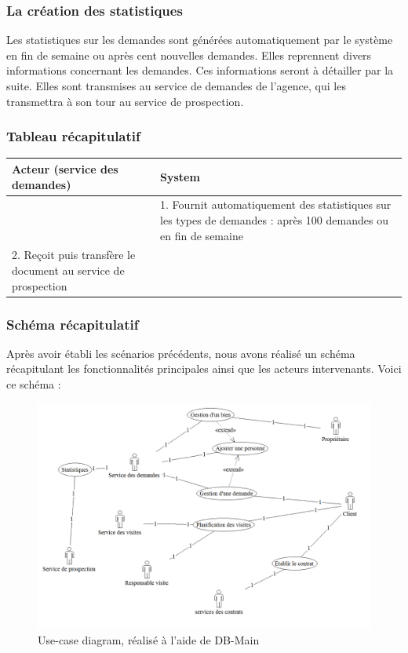 \subsubsection{La création des statistiques}
Les statistiques sur les demandes sont générées automatiquement par le système en fin de semaine ou après cent nouvelles demandes.
Elles reprennent divers informations concernant les demandes. Ces informations seront à détailler par la suite.
Elles sont transmises au service de demandes de l'agence, qui les transmettra à son tour au service de prospection.

\subsubsection*{Tableau récapitulatif}
\begin{longtable}{|p{7.5cm}|p{7.5cm}|}
\hline
Acteur (service des demandes)& System\\
\hline
& 1. Fournit automatiquement des statistiques sur les types de demandes : après 100 demandes ou en fin de semaine\\
2. Reçoit puis transfère le document au service de prospection & \\
\hline
\end{longtable}

\mbox{}
\subsubsection{Schéma récapitulatif}
Après avoir établi les scénarios précédents, nous avons réalisé un schéma récapitulant les fonctionnalités principales ainsi que les acteurs intervenants. Voici ce schéma :

\begin{figure}[H]
\centering
\includegraphics[width=16cm]{use-case.png}
\caption{Use-case diagram, réalisé à l'aide de DB-Main}
\label{fig:diagUC}
\end{figure}
